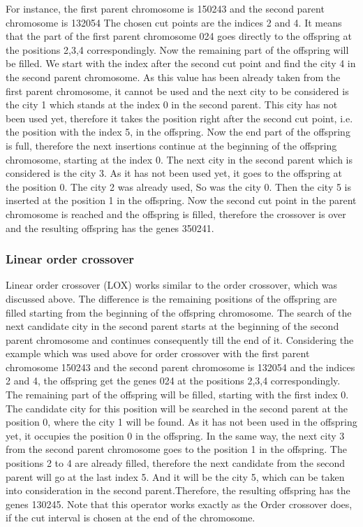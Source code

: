 \documentclass[a4paper, 12pt, headings=standardclasses]{scrartcl}
\begin{document}
For instance, the first parent chromosome is 150243 and the second parent chromosome is 132054 The chosen cut points are the indices 2 and 4. It means that the part of the first parent chromosome 024 goes directly to the offspring at the positions 2,3,4 correspondingly. Now the remaining part of the offspring will be filled. We start with the index after the second cut point and find the city 4 in the second parent chromosome. As this value has been already taken from the first parent chromosome, it cannot be used and the next city to be considered is the city 1 which stands at the index 0 in the second parent. This city has not been used yet, therefore it takes the position right after the second cut point, i.e. the position with the index 5, in the offspring. Now the end part of the offspring is full, therefore the next insertions continue at the beginning of the offspring chromosome, starting at the index 0. The next city in the second parent which is considered is the city 3. As it has not been used yet, it goes to the offspring at the position 0. The city 2 was already used, So was the city 0. Then the city 5 is inserted at the position 1 in the offspring. Now the second cut point in the parent chromosome is reached and the offspring is filled, therefore the crossover is over and the resulting offspring has the genes 350241.

\subsubsection{Linear order crossover}

Linear order crossover (LOX) works similar to the order crossover, which was discussed above. The difference is the remaining positions of the offspring are filled starting from the beginning of the offspring chromosome.  The search of the next candidate city in the second parent  starts at the beginning of the second parent chromosome and continues consequently till the end of it. 
Considering the example which was used above for order crossover with  the first parent chromosome 150243 and the second parent chromosome is 132054 and the indices 2 and 4, the offspring get the genes 024 at the positions 2,3,4 correspondingly. The remaining part of the offspring will be filled, starting with the first index 0. The candidate city for this position will be searched in the second parent at the position 0, where the city 1 will be found. As it has not been used in the offspring yet, it occupies the position 0 in the offspring. In the same way, the next city 3 from the second parent chromosome goes to the position 1 in the offspring. The positions 2 to 4 are already filled, therefore the next candidate from the second parent will go at the last index 5. And it will be the city 5, which can be taken into consideration in the second parent.Therefore, the resulting offspring has the genes 130245.
Note that this operator works exactly as the Order crossover does, if the cut interval is chosen at the end of the chromosome.
\end{document}
